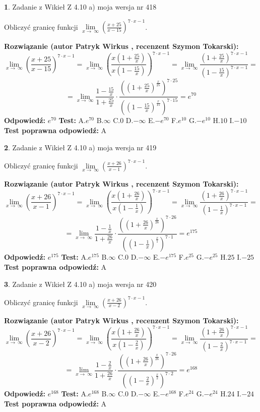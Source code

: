\documentclass[12pt, a4paper]{article}
\theoremstyle{definition} %
\newtheorem{zad}{}
\newcommand{\zadStart}[1]{\begin{zad}#1\newline}
\newcommand{\zadStop}{\end{zad}}
\newcommand{\rozwStart}[2]{\noindent \textbf{Rozwiązanie (autor #1 , recenzent #2): }\newline}
\newcommand{\rozwStop}{\newline}
\newcommand{\odpStart}{\noindent \textbf{Odpowiedź:}\newline}
\newcommand{\odpStop}{\newline}
\newcommand{\testStart}{\noindent \textbf{Test:}\newline}
\newcommand{\testStop}{\newline}
\newcommand{\kluczStart}{\noindent \textbf{Test poprawna odpowiedź:}\newline}
\newcommand{\kluczStop}{\newline}
\begin{document}
\zadStart{Zadanie z Wikieł Z 4.10 a) moja wersja nr 418}

Obliczyć granicę funkcji  $\lim\limits_{x\to\ \infty}(\frac{x+25}{x-15})^{7\cdot x-1}$.
\zadStop
\rozwStart{Patryk Wirkus}{Szymon Tokarski}
$$\lim\limits_{x\to\ \infty}(\frac{x+25}{x-15})^{7\cdot x-1} = \lim\limits_{x\to\ \infty}(\frac{x(1+\frac{25}{x})}{x(1-\frac{15}{x})})^{7\cdot x-1}=\lim\limits_{x\to\ \infty}\frac{(1+\frac{25}{x})^{7\cdot x-1}}{(1-\frac{15}{x})^{7\cdot x-1}}=$$
$$=\lim\limits_{x\to\ \infty}\frac{1-\frac{15}{x}}{1+\frac{25}{x}}\cdot\frac{((1+\frac{25}{x})^{\frac{x}{25}})^{7\cdot25}}{((1-\frac{15}{x})^{\frac{x}{15}})^{7\cdot15}}=e^{70}$$
\rozwStop
\odpStart
$e^{70}$
\odpStop
\testStart
A.$e^{70}$ B.$\infty$ C.$0$ D.$-\infty$ E.$-e^{70}$
F.$e^{10}$ G.$-e^{10}$
H.$10$
I.$-10$
\testStop
\kluczStart
A
\kluczStop



\zadStart{Zadanie z Wikieł Z 4.10 a) moja wersja nr 419}

Obliczyć granicę funkcji  $\lim\limits_{x\to\ \infty}(\frac{x+26}{x-1})^{7\cdot x-1}$.
\zadStop
\rozwStart{Patryk Wirkus}{Szymon Tokarski}
$$\lim\limits_{x\to\ \infty}(\frac{x+26}{x-1})^{7\cdot x-1} = \lim\limits_{x\to\ \infty}(\frac{x(1+\frac{26}{x})}{x(1-\frac{1}{x})})^{7\cdot x-1}=\lim\limits_{x\to\ \infty}\frac{(1+\frac{26}{x})^{7\cdot x-1}}{(1-\frac{1}{x})^{7\cdot x-1}}=$$
$$=\lim\limits_{x\to\ \infty}\frac{1-\frac{1}{x}}{1+\frac{26}{x}}\cdot\frac{((1+\frac{26}{x})^{\frac{x}{26}})^{7\cdot26}}{((1-\frac{1}{x})^{\frac{x}{1}})^{7\cdot1}}=e^{175}$$
\rozwStop
\odpStart
$e^{175}$
\odpStop
\testStart
A.$e^{175}$ B.$\infty$ C.$0$ D.$-\infty$ E.$-e^{175}$
F.$e^{25}$ G.$-e^{25}$
H.$25$
I.$-25$
\testStop
\kluczStart
A
\kluczStop



\zadStart{Zadanie z Wikieł Z 4.10 a) moja wersja nr 420}

Obliczyć granicę funkcji  $\lim\limits_{x\to\ \infty}(\frac{x+26}{x-2})^{7\cdot x-1}$.
\zadStop
\rozwStart{Patryk Wirkus}{Szymon Tokarski}
$$\lim\limits_{x\to\ \infty}(\frac{x+26}{x-2})^{7\cdot x-1} = \lim\limits_{x\to\ \infty}(\frac{x(1+\frac{26}{x})}{x(1-\frac{2}{x})})^{7\cdot x-1}=\lim\limits_{x\to\ \infty}\frac{(1+\frac{26}{x})^{7\cdot x-1}}{(1-\frac{2}{x})^{7\cdot x-1}}=$$
$$=\lim\limits_{x\to\ \infty}\frac{1-\frac{2}{x}}{1+\frac{26}{x}}\cdot\frac{((1+\frac{26}{x})^{\frac{x}{26}})^{7\cdot26}}{((1-\frac{2}{x})^{\frac{x}{2}})^{7\cdot2}}=e^{168}$$
\rozwStop
\odpStart
$e^{168}$
\odpStop
\testStart
A.$e^{168}$ B.$\infty$ C.$0$ D.$-\infty$ E.$-e^{168}$
F.$e^{24}$ G.$-e^{24}$
H.$24$
I.$-24$
\testStop
\kluczStart
A
\kluczStop
\end{document}
